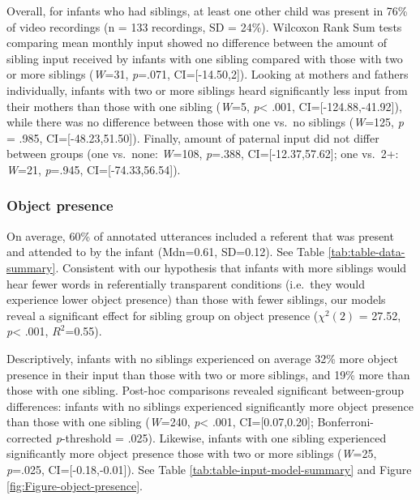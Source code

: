 \documentclass[
  man,mask,floatsintext]{apa6}
\begin{document}
Overall, for infants who had siblings, at least one other child was present in 76\% of video recordings (n = 133 recordings, SD = 24\%). Wilcoxon Rank Sum tests comparing mean monthly input showed no difference between the amount of sibling input received by infants with one sibling compared with those with two or more siblings (\emph{W}=31, \emph{p}=.071, CI={[}-14.50,2{]}). Looking at mothers and fathers individually, infants with two or more siblings heard significantly less input from their mothers than those with one sibling (\emph{W}=5, \emph{p}\textless{} .001, CI={[}-124.88,-41.92{]}), while there was no difference between those with one vs.~no siblings (\emph{W}=125, \emph{p} = .985, CI={[}-48.23,51.50{]}). Finally, amount of paternal input did not differ between groups (one vs.~none: \emph{W}=108, \emph{p}=.388, CI={[}-12.37,57.62{]}; one vs.~2+: \emph{W}=21, \emph{p}=.945, CI={[}-74.33,56.54{]}).

\hypertarget{object-presence}{%
\subsubsection{Object presence}\label{object-presence}}

On average, 60\% of annotated utterances included a referent that was present and attended to by the infant (Mdn=0.61, SD=0.12). See Table \ref{tab:table-data-summary}. Consistent with our hypothesis that infants with more siblings would hear fewer words in referentially transparent conditions (i.e.~they would experience lower object presence) than those with fewer siblings, our models reveal a significant effect for sibling group on object presence (\(\chi^2 (2)\) = 27.52, \emph{p}\textless{} .001, \(R^2\)=0.55).

Descriptively, infants with no siblings experienced on average 32\% more object presence in their input than those with two or more siblings, and 19\% more than those with one sibling. Post-hoc comparisons revealed significant between-group differences: infants with no siblings experienced significantly more object presence than those with one sibling (\emph{W}=240, \emph{p}\textless{} .001, CI={[}0.07,0.20{]}; Bonferroni-corrected \emph{p}-threshold = .025). Likewise, infants with one sibling experienced significantly more object presence those with two or more siblings (\emph{W}=25, \emph{p}=.025, CI={[}-0.18,-0.01{]}). See Table \ref{tab:table-input-model-summary} and Figure \ref{fig:Figure-object-presence}.
\end{document}
